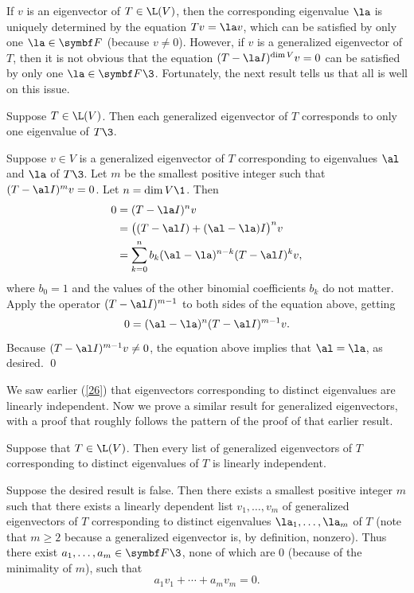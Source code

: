 If $v$ is an eigenvector of $T \in \L(V)$, then the corresponding eigenvalue $\la$ is uniquely determined by the equation $Tv = \la v$, which can be satisfied by only one $\la \in \F{}$ (because $v\ne 0$).
However, if $v$ is a generalized eigenvector of $T$, then it is not obvious that the equation $(T - \la I)^{\dim V}v = 0$ can be satisfied by only one $\la \in \F{}\3$. Fortunately, the next result tells us that all is well on this issue.

{Suppose $T \in \L(V)$. Then each generalized eigenvector of $T$ corresponds to only one eigenvalue of $T\3$.}

\proof
Suppose $v \in V$ is a generalized eigenvector of $T$ corresponding to eigenvalues $\al$ and $\la$ of $T\3$. Let $m$ be the smallest positive integer such that $(T - \al I)^m v = 0$. Let $n = \dim V\1$. Then
\begin{align*}
0 &= (T - \la I)^n v \\
&= \paren[\big]{ (T - \al I) + (\al - \la) I }^n v \\
&= \sum_{k=0}^n b_k (\al - \la)^{n-k} (T - \al I)^k v,
\end{align*}
where $b_0 = 1$ and the values of the other binomial coefficients $b_k$ do not matter. Apply the operator $(T - \al I)^{m-1}$ to both sides of the equation above, getting
\[
0 = (\al - \la)^n (T - \al I)^{m-1} v.
\]
Because $(T - \al I)^{m-1} v \ne 0$, the equation above implies that $\al = \la$, as desired.
\qed

We saw earlier (\ref{26}) that eigenvectors corresponding to distinct eigenvalues are linearly independent. Now we prove a similar result for generalized eigenvectors, with a proof that roughly follows the pattern of the proof of that earlier result.

{Suppose that $T \in \L(V)$. Then every list of generalized eigenvectors of $T$ corresponding to distinct eigenvalues of $T$ is linearly independent.}

\proof
Suppose the desired result is false. Then there exists a smallest positive integer $m$ such that there exists a linearly dependent list
$v_1, \ldots, v_m$ of generalized eigenvectors of $T$ corresponding to distinct eigenvalues $\la_1, \ldots, \la_m$ of $T$ (note that $m\ge 2$ because a generalized eigenvector is, by definition, nonzero). Thus there exist
$a_1, \ldots, a_m \in \F{}\3$, none of which are $0$ (because of the minimality of $m$), such that
\[
a_1 v_1 + \cdots + a_m v_m = 0.
\]

